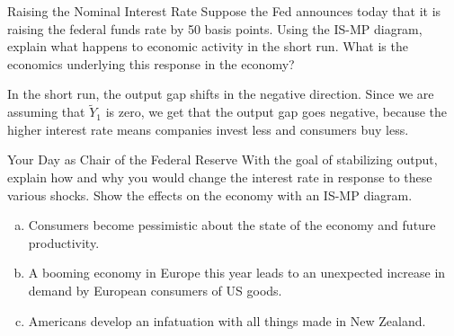 \documentclass[10pt]{extarticle}
\title{}
\author{Avinash Iyer}
\date{}
\begin{document}
{
  \begin{problem}{Raising the Nominal Interest Rate}
    Suppose the Fed announces today that it is raising the federal funds rate by 50 basis points. Using the IS-MP diagram, explain what happens to economic activity in the short run. What is the economics underlying this response in the economy?
    \tcblower
      \begin{center}
      \end{center}
      In the short run, the output gap shifts in the negative direction. Since we are assuming that $\tilde{Y}_1$ is zero, we get that the output gap goes negative, because the higher interest rate means companies invest less and consumers buy less.
  \end{problem}
  \begin{problem}{Your Day as Chair of the Federal Reserve}
    With the goal of stabilizing output, explain how and why you would change the interest rate in response to these various shocks. Show the effects on the economy with an IS-MP diagram.
    \begin{enumerate}[(a)]
      \item Consumers become pessimistic about the state of the economy and future productivity.
      \item A booming economy in Europe this year leads to an unexpected increase in demand by European consumers of US goods.
      \item Americans develop an infatuation with all things made in New Zealand.
    \end{enumerate}
  \end{problem}

}
\end{document}
